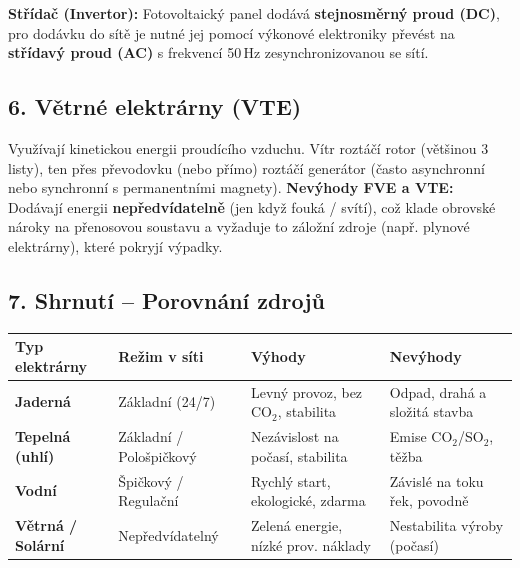 \documentclass[a4paper,10pt]{article}
\begin{document}
\begin{vysvetlenibox}
\begin{center}
\end{center}

\textbf{Střídač (Invertor):} Fotovoltaický panel dodává \textbf{stejnosměrný proud (DC)}, pro dodávku do sítě je nutné jej pomocí výkonové elektroniky převést na \textbf{střídavý proud (AC)} s frekvencí 50\,Hz zesynchronizovanou se sítí.

\subsection*{6. Větrné elektrárny (VTE)}

Využívají kinetickou energii proudícího vzduchu. Vítr roztáčí rotor (většinou 3 listy), ten přes převodovku (nebo přímo) roztáčí generátor (často asynchronní nebo synchronní s permanentními magnety).
\textbf{Nevýhody FVE a VTE:} Dodávají energii \textbf{nepředvídatelně} (jen když fouká / svítí), což klade obrovské nároky na přenosovou soustavu a vyžaduje to záložní zdroje (např. plynové elektrárny), které pokryjí výpadky.

\subsection*{7. Shrnutí – Porovnání zdrojů}

\begin{center}
\begin{tabularx}{0.97\linewidth}{@{} l X l l @{}}
\toprule
\textbf{Typ elektrárny} & \textbf{Režim v síti} & \textbf{Výhody} & \textbf{Nevýhody} \\
\midrule
\textbf{Jaderná} & Základní (24/7) & Levný provoz, bez CO$_2$, stabilita & Odpad, drahá a složitá stavba \\
\textbf{Tepelná (uhlí)} & Základní / Pološpičkový & Nezávislost na počasí, stabilita & Emise CO$_2$/SO$_2$, těžba \\
\textbf{Vodní} & Špičkový / Regulační & Rychlý start, ekologické, zdarma & Závislé na toku řek, povodně \\
\textbf{Větrná / Solární} & Nepředvídatelný & Zelená energie, nízké prov. náklady & Nestabilita výroby (počasí) \\
\bottomrule
\end{tabularx}
\end{center}

\end{vysvetlenibox}
\end{document}
